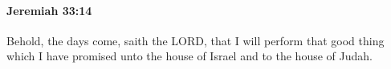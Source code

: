 
		\paragraph{Jeremiah 33:14} %
			\label{JEREMIAH-33-14}

			Behold, the days come, saith the LORD, that I will perform that good thing which I have promised unto the house of Israel and to the house of Judah.


